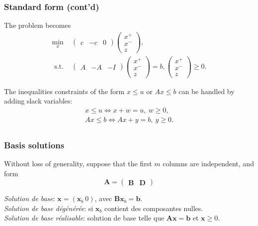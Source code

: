 \documentclass{beamer}
\def\bb{\boldsymbol{b}}
\def\bx{\boldsymbol{x}}
\def\bA{\boldsymbol{A}}
\def\bB{\boldsymbol{B}}
\def\bD{\boldsymbol{D}}
\begin{document}
\begin{frame}
\frametitle{Standard form (cont'd)}

The problem becomes
\begin{align*}
\min_x\ &
\begin{pmatrix}
c & -c & 0
\end{pmatrix}
\begin{pmatrix}
x^+ \\ x^- \\ z
\end{pmatrix}, \\
\mbox{ s.t. } &
\begin{pmatrix}
A & -A & -I
\end{pmatrix}
\begin{pmatrix}
x^+ \\ x^- \\ z
\end{pmatrix} = b,
\begin{pmatrix}
x^+ \\ x^- \\ z
\end{pmatrix} \geq 0.
\end{align*}

The inequalities constraints of the form $x \leq u$ or $Ax \leq b$ can be handled by adding slack variables:
\begin{align*}
x \leq u \Leftrightarrow x+w = u,\ w \geq 0, \\
Ax \leq b \Leftrightarrow Ax + y = b,\ y \geq 0. \\
\end{align*}

\end{frame}

\begin{frame}
	\frametitle{Basis solutions}

Without loss of generality, suppose that the first $m$ columns are independent, and form
	\[
	\bA =
	\begin{pmatrix}
		\bB & \bD
	\end{pmatrix}
	\]
	
	\mbox{}
	
	{\it Solution de base}: $\bx = (\bx_b \ 0)$, avec $\bB\bx_b = \bb$.\\
	{\it Solution de base dégénérée}: si $\bx_b$ contient des composantes nulles. \\
	{\it Solution de base réalisable}: solution de base telle que $\bA\bx = \bb$ et $\bx \geq 0$.

\end{frame}
\end{document}
